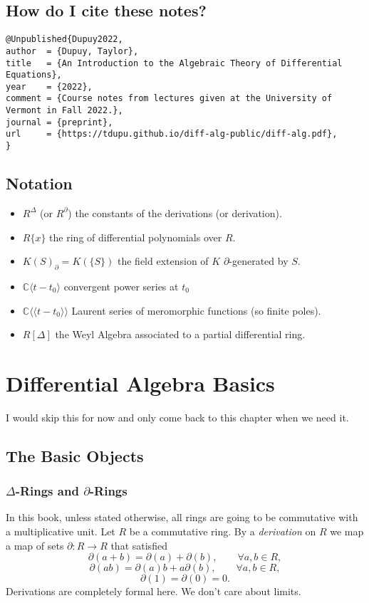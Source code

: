 \documentclass[12pt]{book}
\numberwithin{equation}{section}
\theoremstyle{definition}
\theoremstyle{remark}
\newcommand{\CC}{\mathbb{C}}
\newcommand{\llangle}{\langle \langle}
\newcommand{\rrangle}{\rangle \rangle}
\begin{document}
\section{How do I cite these notes?}

\begin{verbatim}
@Unpublished{Dupuy2022,
author  = {Dupuy, Taylor},
title   = {An Introduction to the Algebraic Theory of Differential Equations},
year    = {2022},
comment = {Course notes from lectures given at the University of Vermont in Fall 2022.},
journal = {preprint},
url     = {https://tdupu.github.io/diff-alg-public/diff-alg.pdf},
}

\end{verbatim}

\newpage 
\section{Notation}
\begin{itemize}
	\item $R^{\Delta}$ (or $R^{\partial}$) the constants of the derivations (or derivation). 
	\item $R\lbrace x \rbrace$ the ring of differential polynomials over $R$.
	\item $K(S)_{\partial} = K(\lbrace S \rbrace)$ the field extension of $K$ $\partial$-generated by $S$.
	\item $\CC\langle t-t_0 \rangle$ convergent power series at $t_0$
	\item $\CC\llangle t-t_0\rrangle$ Laurent series of meromorphic functions (so finite poles).
	\item $R[\Delta]$ the Weyl Algebra associated to a partial differential ring.
\end{itemize}
\newpage

\mainmatter



\chapter{Differential Algebra Basics}
I would skip this for now and only come back to this chapter when we need it. 

\section{The Basic Objects}

\subsection{$\Delta$-Rings and $\partial$-Rings}
In this book, unless stated otherwise, all rings are going to be commutative with a multiplicative unit. 
Let $R$ be a commutative ring. 
By a \emph{derivation} on $R$ we map a map of sets $\partial:R\to R$ that satisfied 
 $$ \partial(a+b) = \partial(a) + \partial(b), \qquad \forall a,b\in R,$$
 $$ \partial(ab) = \partial(a) b + a\partial(b), \qquad \forall a, b \in R, $$
 $$ \partial(1) = \partial(0) = 0.$$
Derivations are completely formal here. 
We don't care about limits. 
\end{document}
